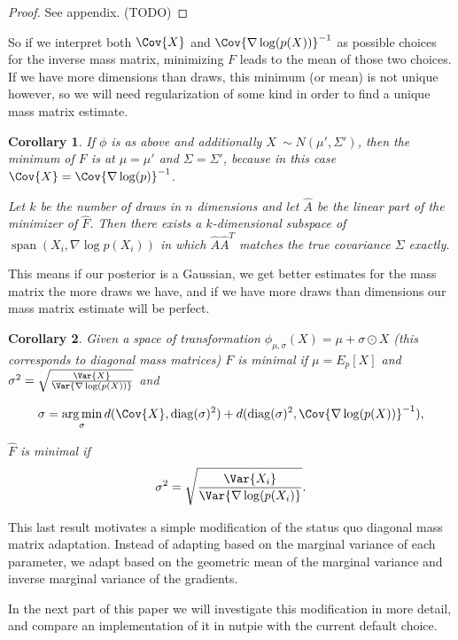 \documentclass{scrartcl}
\DeclareMathOperator{\diag}{diag}
\DeclareMathOperator*{\argmin}{arg\,min}
\DeclareMathOperator{\vecSpan}{span}
\newtheorem{cor}{Corollary}
\begin{document}
\begin{proof}
See appendix. (TODO)
\end{proof}

So if we interpret both $\Cov{X}$ and $\Cov{\nabla \log(p(X))}^{-1}$ as
possible choices for the inverse mass matrix, minimizing $F$ leads to the mean
of those two choices. If we have more dimensions than draws, this minimum (or
mean) is not unique however, so we will need regularization of some kind in
order to find a unique mass matrix estimate.

\begin{cor}
If $\phi$ is as above and additionally $X ~ \sim N(\mu', \Sigma')$,
then the minimum of $F$ is at $\mu = \mu'$ and $\Sigma = \Sigma'$, because in
this case $\Cov{X} = \Cov{\nabla \log(p)}^{-1}$.

Let $k$ be the number of draws in $n$ dimensions and let $\hat A$ be the linear
part of the minimizer of $\hat F$. Then there exists a $k$-dimensional
subspace of $\vecSpan(X_i, \nabla\log p(X_i))$ in which $\hat A\hat A^T$
matches the true covariance $\Sigma$ exactly.
\end{cor}

This means if our posterior is a Gaussian, we get better estimates for the mass
matrix the more draws we have, and if we have more draws than dimensions our
mass matrix estimate will be perfect.

\begin{cor}
Given a space of transformation $\phi_{\mu, \sigma}(X) = \mu + \sigma \odot X$
(this corresponds to diagonal mass matrices) $F$ is minimal if $\mu =
E_p[X]$ and $\sigma^2 = \sqrt{\frac{\Var{X}}{\Var{\nabla \log(p(X))}}}$
and

\[
\sigma
  = \argmin_{\sigma} d(\Cov{X}, \diag(\sigma)^2)
    + d(\diag(\sigma)^2, \Cov{\nabla\log(p(X))}^{-1}),
\]

$\hat F$ is minimal if
\[
\sigma^2 = \sqrt{\frac{\Var{X_i}}{\Var{\nabla \log(p(X_i)}}}.
\]
\end{cor}

This last result motivates a simple modification of the status quo diagonal
mass matrix adaptation. Instead of adapting based on the marginal variance of
each parameter, we adapt based on the geometric mean of the marginal variance
and inverse marginal variance of the gradients.

In the next part of this paper we will investigate this modification in more
detail, and compare an implementation of it in nutpie with the current default
choice.
\end{document}
